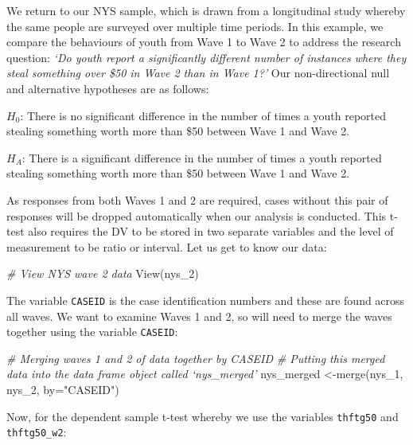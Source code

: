 \documentclass[
]{book}
\newenvironment{Shaded}{\begin{snugshade}}{\end{snugshade}}
\newcommand{\AttributeTok}[1]{\textcolor[rgb]{0.77,0.63,0.00}{#1}}
\newcommand{\CommentTok}[1]{\textcolor[rgb]{0.56,0.35,0.01}{\textit{#1}}}
\newcommand{\ConstantTok}[1]{\textcolor[rgb]{0.00,0.00,0.00}{#1}}
\newcommand{\FunctionTok}[1]{\textcolor[rgb]{0.00,0.00,0.00}{#1}}
\newcommand{\NormalTok}[1]{#1}
\newcommand{\OtherTok}[1]{\textcolor[rgb]{0.56,0.35,0.01}{#1}}
\newcommand{\SpecialCharTok}[1]{\textcolor[rgb]{0.00,0.00,0.00}{#1}}
\newcommand{\StringTok}[1]{\textcolor[rgb]{0.31,0.60,0.02}{#1}}
\begin{document}
We return to our NYS sample, which is drawn from a longitudinal study whereby the same people are surveyed over multiple time periods. In this example, we compare the behaviours of youth from Wave 1 to Wave 2 to address the research question: \emph{`Do youth report a significantly different number of instances where they steal something over \$50 in Wave 2 than in Wave 1?'} Our non-directional null and alternative hypotheses are as follows:

\(H_0\): There is no significant difference in the number of times a youth reported stealing something worth more than \$50 between Wave 1 and Wave 2.

\(H_A\): There is a significant difference in the number of times a youth reported stealing something worth more than \$50 between Wave 1 and Wave 2.

As responses from both Waves 1 and 2 are required, cases without this pair of responses will be dropped automatically when our analysis is conducted. This t-test also requires the DV to be stored in two separate variables and the level of measurement to be ratio or interval. Let us get to know our data:

\begin{Shaded}
\begin{Highlighting}[]
\CommentTok{\# View NYS wave 2 data }
\FunctionTok{View}\NormalTok{(nys\_2)}
\end{Highlighting}
\end{Shaded}

The variable \texttt{CASEID} is the case identification numbers and these are found across all waves. We want to examine Waves 1 and 2, so will need to merge the waves together using the variable \texttt{CASEID}:

\begin{Shaded}
\begin{Highlighting}[]
\CommentTok{\# Merging waves 1 and 2 of data together by CASEID}
\CommentTok{\# Putting this merged data into the data frame object called ‘nys\_merged’}
\NormalTok{nys\_merged }\OtherTok{\textless{}{-}}\FunctionTok{merge}\NormalTok{(nys\_1, nys\_2, }\AttributeTok{by=}\StringTok{"CASEID"}\NormalTok{)}
\end{Highlighting}
\end{Shaded}

Now, for the dependent sample t-test whereby we use the variables \texttt{thftg50} and \texttt{thftg50\_w2}:

\begin{Shaded}
\end{Shaded}
\end{document}
